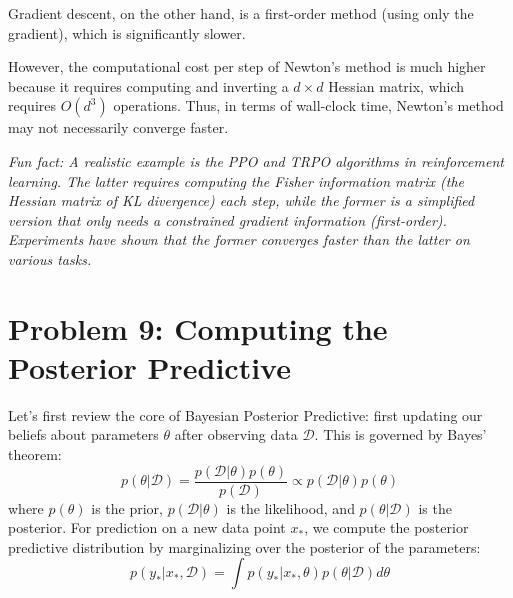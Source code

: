 \documentclass[11pt, a4paper, oneside]{memoir}
\begin{document}
Gradient descent, on the other hand, is a first-order method (using only the gradient),
which is significantly slower.

However, the computational cost per step of Newton's method is much higher
because it requires computing and inverting a $d \times d$ Hessian matrix,
which requires $O(d^3)$ operations. Thus, in terms of wall-clock time, Newton's method may not necessarily converge faster.

\textit{Fun fact: A realistic example is the PPO and TRPO algorithms in reinforcement learning.
The latter requires computing the Fisher information matrix (the Hessian matrix of KL divergence) each step,
while the former is a simplified version that only needs a constrained gradient information (first-order).
Experiments have shown that the former converges faster than the latter on various tasks.}

\chapter{Problem 9: Computing the Posterior Predictive}
Let's first review the core of Bayesian Posterior Predictive: first updating our beliefs about parameters $\theta$ after observing data $\mathcal{D}$.
This is governed by Bayes' theorem:
\[ p(\theta | \mathcal{D}) = \frac{p(\mathcal{D} | \theta) p(\theta)}{p(\mathcal{D})} \propto p(\mathcal{D} | \theta) p(\theta) \]
where $p(\theta)$ is the prior, $p(\mathcal{D} | \theta)$ is the likelihood, and $p(\theta | \mathcal{D})$ is the posterior.
For prediction on a new data point $x_*$, we compute the posterior predictive distribution by marginalizing over the posterior of the parameters:
\[ p(y_* | x_*, \mathcal{D}) = \int p(y_* | x_*, \theta) p(\theta | \mathcal{D}) d\theta \]
\end{document}
